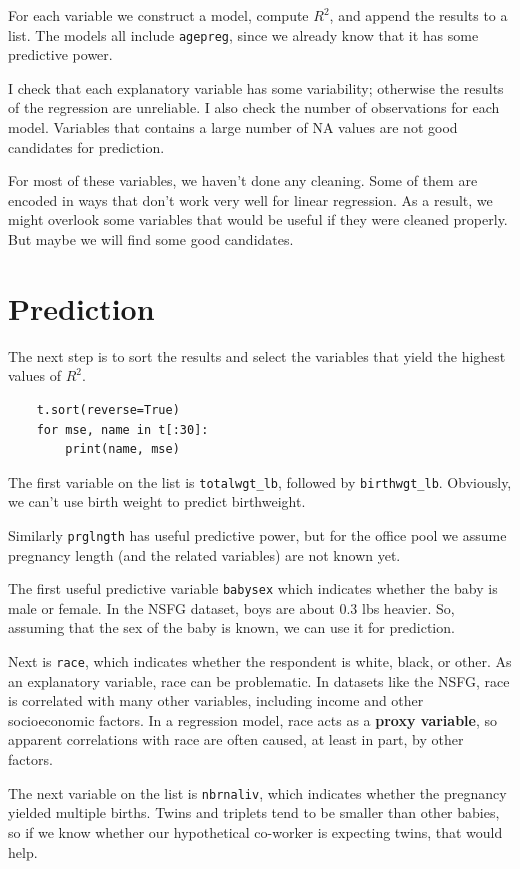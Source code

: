 \documentclass[12pt]{book}
\begin{document}
For each variable we construct a model, compute $R^2$, and append
the results to a list.  The models all include {\tt agepreg}, since
we already know that it has some predictive power.

I check that each explanatory variable has some variability; otherwise
the results of the regression are unreliable.  I also check the number
of observations for each model.  Variables that contains a large number
of NA values are not good candidates for prediction.

For most of these variables, we haven't done any cleaning.  Some of them
are encoded in ways that don't work very well for linear regression.
As a result, we might overlook some variables that would be useful if
they were cleaned properly.  But maybe we will find some good candidates.


\section{Prediction}

The next step is to sort the results and select the variables that
yield the highest values of $R^2$.

\begin{verbatim}
    t.sort(reverse=True)
    for mse, name in t[:30]:
        print(name, mse)
\end{verbatim}

The first variable on the list is \verb"totalwgt_lb",
followed by \verb"birthwgt_lb".  Obviously, we can't use birth
weight to predict birthweight.

Similarly {\tt prglngth} has useful predictive power, but for the
office pool we assume pregnancy length (and the related variables)
are not known yet.

The first useful predictive variable {\tt babysex} which indicates
whether the baby is male or female.  In the NSFG dataset, boys are
about 0.3 lbs heavier.  So, assuming that the sex of the baby is
known, we can use it for prediction.

Next is {\tt race}, which indicates whether the respondent is white,
black, or other.  As an explanatory variable, race can be problematic.
In datasets like the NSFG, race is correlated with many other
variables, including income and other socioeconomic factors.  In a
regression model, race acts as a {\bf proxy variable},
so apparent correlations with race are often caused, at least in
part, by other factors.

The next variable on the list is {\tt nbrnaliv}, which indicates
whether the pregnancy yielded multiple births.  Twins and triplets
tend to be smaller than other babies, so if we know whether our
hypothetical co-worker is expecting twins, that would help.
\end{document}

